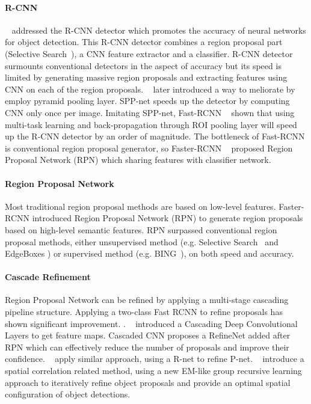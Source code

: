 \documentclass[10pt,twocolumn,letterpaper]{article}
\begin{document}
\paragraph{R-CNN}
~\citet{RCNN} addressed the R-CNN detector which promotes the accuracy of neural networks for object detection. This R-CNN detector combines a region proposal part (Selective Search~\cite{SelectiveSearch}), a CNN feature extractor and a classifier. R-CNN detector surmounts conventional detectors in the aspect of accuracy but its speed is limited by generating massive region proposals and extracting features using CNN on each of the region proposals. ~\citet{SPP} later introduced a way to meliorate by employ pyramid pooling layer. SPP-net speeds up the detector by computing CNN only once per image. Imitating SPP-net, Fast-RCNN ~\cite{fastRCNN} shown that using multi-task learning and back-propagation through ROI pooling layer will speed up the R-CNN detector by an order of magnitude. The bottleneck of Fast-RCNN is conventional region proposal generator, so Faster-RCNN ~\cite{fasterRCNN} proposed Region Proposal Network (RPN) which sharing features with classifier network.
\paragraph{Region Proposal Network}
Most traditional region proposal methods are based on low-level features. Faster-RCNN introduced Region Proposal Network (RPN) to generate region proposals based on high-level semantic features. RPN surpassed conventional region proposal methods, either unsupervised method (e.g. Selective Search~\cite{SelectiveSearch} and EdgeBoxes \cite{EdgeBoxes}) or supervised method (e.g. BING~\cite{BING}), on both speed and accuracy.
\paragraph{Cascade Refinement}
Region Proposal Network can be refined by applying a multi-stage cascading pipeline structure. Applying a two-class Fast RCNN to refine proposals has shown significant improvement. \cite{CRAFT} \cite{CraftingGBD} \cite{DeepBox}.  ~\citet{DeepProposal} introduced a Cascading Deep Convolutional Layers to get feature maps. Cascaded CNN \cite{Cascadedcnn} proposes a RefineNet added after RPN which can effectively reduce the number of proposals and improve their confidence. ~\citet{MTCNN} apply similar approach, using a R-net to refine P-net. ~\citet{GroupRecursive} introduce a spatial correlation related method, using a new EM-like group recursive learning approach to iteratively refine object proposals and provide an optimal spatial configuration of object detections.
\end{document}
